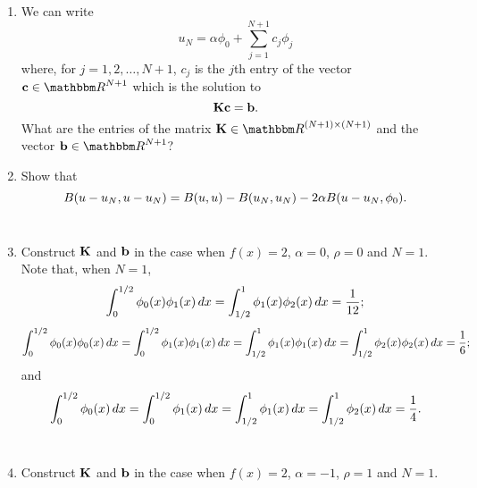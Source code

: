 \begin{enumerate}
\item We can write
\[
u_N=\alpha\phi_0+\sum_{j=1}^{N+1}c_j\phi_j
\]
where, for $j=1,2,\ldots,N+1$, $c_j$ is the $j$th entry of the vector $\Bc\in\R^{N+1}$ which is the solution to
\[
{\bf K}{\bf c}={\bf b}.
\]
What are the entries of the matrix $\BK\in\R^{\left(N+1\right)\times\left(N+1\right)}$ and the vector $\Bb\in\R^{N+1}$? 
\\
\item Show that
\[
B(u-u_N,u-u_N)=B(u,u)-B(u_N,u_N)-2\alpha B(u-u_N,\phi_0).
\]
\\
\item Construct ${\bf K}$ and ${\bf b}$ in the case when $f(x)=2$, $\alpha=0$, $\rho=0$ and $N=1$. Note that, when $N=1$,
\[
\int_0^{1/2}\phi_0(x)\phi_1(x)\,dx=\int_{1/2}^1\phi_1(x)\phi_2(x)\,dx={1 \over 12};
\]
\[
\int_0^{1/2}\phi_0(x)\phi_0(x)\,dx=\int_0^{1/2}\phi_1(x)\phi_1(x)\,dx=\int_{1/2}^1\phi_1(x)\phi_1(x)\,dx=\int_{1/2}^1\phi_2(x)\phi_2(x)\,dx={1 \over 6};
\]
and
\[
\int_0^{1/2}\phi_0(x)\,dx=\int_0^{1/2}\phi_1(x)\,dx=\int_{1/2}^1\phi_1(x)\,dx=\int_{1/2}^1\phi_2(x)\,dx={1 \over 4}.
\]
\\
\item Construct ${\bf K}$ and ${\bf b}$ in the case when $f(x)=2$, $\alpha=-1$, $\rho=1$ and $N=1$.
\end{enumerate}



